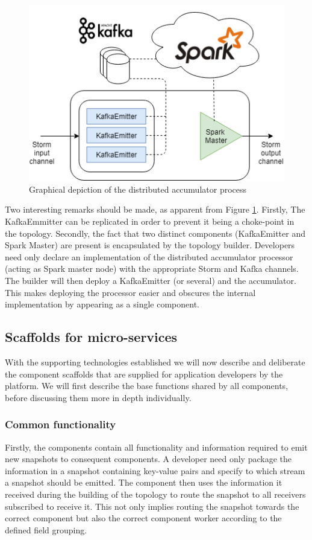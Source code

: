 \begin{figure}
\centering
\includegraphics[width=.7\textwidth]{resources/img/distributed_accumulator.png}
\caption{Graphical depiction of the distributed accumulator process}
\label{fig:distributed_accumulator}
\end{figure}

Two interesting remarks should be made, as apparent from Figure \ref{fig:distributed_accumulator}. Firstly, The KafkaEmmitter can be replicated in order to prevent it being a choke-point in the topology. Secondly, the fact that two distinct components (KafkaEmitter and Spark Master) are present is encapsulated by the topology builder. Developers need only declare an implementation of the distributed accumulator processor (acting as Spark master node) with the appropriate Storm and Kafka channels. The builder will then deploy a KafkaEmitter (or several) and the accumulator. This makes deploying the processor easier and obscures the internal implementation by appearing as a single component.

\subsection{Scaffolds for micro-services}
With the supporting technologies established we will now describe and deliberate the component scaffolds that are supplied for application developers by the platform. We will first describe the base functions shared by all components, before discussing them more in depth individually.

\subsubsection*{Common functionality}
Firstly, the components contain all functionality and information required to emit new snapshots to consequent components. A developer need only package the information in a snapshot containing key-value pairs and specify to which stream a snapshot should be emitted. The component then uses the information it received during the building of the topology to route the snapshot to all receivers subscribed to receive it. This not only implies routing the snapshot towards the correct component but also the correct component worker according to the defined field grouping.

